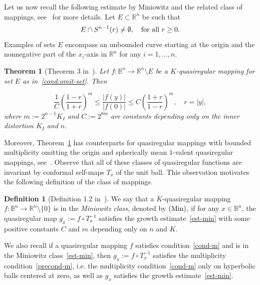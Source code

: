 \documentclass[11pt,a4paper,reqno]{amsart}
\newtheorem{theorem}{Theorem}[section]
\theoremstyle{definition}
\newtheorem{defn}{Definition}[section]
\newcommand{\B}{\mathbb{B}^n}
\newcommand{\Rn}{{\mathbb R}^n}
\numberwithin{komcounter}{section}
\begin{document}
 Let us now recall the following estimate by Miniowitz and the related class of mappings, see~\cite{ag2} for more details. Let $E \subset \mathbb{R}^n$ be such that
\begin{equation}\label{cond:omit-set}
E\cap S^{n-1}(r)\not=\emptyset,\quad \hbox{for all } r\geq 0.
\end{equation}
Examples of sets $E$ encompass an unbounded curve starting at the origin and the nonnegative part of the $x_i$-axis in $\Rn$ for any $i=1,\ldots,n$.
\begin{theorem}[Theorem 3 in~\cite{M1}]\label{thm-min}
Let $f:\B\to \Rn\setminus E$ be a $K$-quasiregular mapping for set $E$ as in~\eqref{cond:omit-set}. Then

\begin{equation}\label{est-min}\tag{Min}
\frac{1}{C}\left(\frac{1-r}{1+r}\right)^{m} \leq \frac{|f(y)|}{|f(0)|} \leq C\left(\frac{1+r}{1-r}\right)^{m},\quad r=|y|,
\end{equation}
 where $m:=2^{n-1}K_I$ and $C:=2^{8m}$ are constants depending only on the inner distortion $K_I$ and $n$.
\end{theorem}

Moreover, Theorem~\ref{thm-min} has counterparts for quasiregular mappings with bounded multiplicity omitting the origin and spherically mean $1$-valent quasiregular mappings, see~\cite{M1}. Observe that all of these classes of quasiregular functions are invariant by conformal self-maps $T_x$ of the unit ball. This observation motivates the following definition of the class of mappings.

\begin{defn}[Definition 1.2 in~\cite{ag2}] 
	We say that a $K$-quasiregular mapping  $f:\B \to \Rn\setminus\{0\} $  is in the \emph{Miniowitz class}, denoted by ${\rm (Min)}$, if  for any $x\in \B$, the quasiregular map $g_x:=f\circ T_x^{-1}$ satisfies the growth estimate~\eqref{est-min} with some positive constants $C$ and $m$ depending only on $n$ and $K$.
\end{defn}
We also recall if a quasiregular mapping $f$ satisfies condition~\eqref{cond-m} and is in the Miniowitz class~\eqref{est-min}, then $g_x:=f\circ T_x^{-1}$ satisfies the multiplicity condition~\eqref{precond-m}, i.e. the multiplicity condition~\eqref{cond-m} only on hyperbolic balls centered at zero, as well as $g_x$ satisfies the growth estimate~\eqref{est-min}. 
\end{document}
